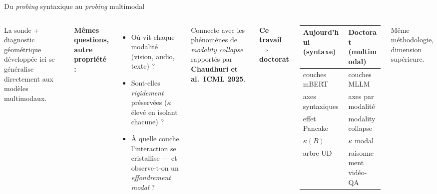 \documentclass[aspectratio=169,11pt]{beamer}
\begin{document}
\begin{frame}{Du \emph{probing} syntaxique au \emph{probing} multimodal}
  \begin{columns}[T]
    La sonde + diagnostic géométrique développée ici se généralise
    \alert{directement} aux modèles multimodaux.

    \vspace{0.3cm}
    \textbf{Mêmes questions, autre propriété :}
    \begin{itemize}\setlength\itemsep{4pt}
      \item Où vit chaque modalité (vision, audio, texte) ?
      \item Sont-elles \emph{rigidement} préservées
            ($\kappa$ élevé en isolant chacune) ?
      \item À quelle couche l'interaction se cristallise --- et
            observe-t-on un \emph{effondrement modal} ?
    \end{itemize}

    \vspace{0.3cm}
    \footnotesize
    Connecte avec les phénomènes de \emph{modality collapse} rapportés
    par \textbf{Chaudhuri et al.\ ICML 2025}.

    \centering
    \footnotesize
    \textbf{Ce travail \quad $\Longrightarrow$ \quad doctorat}

    \vspace{0.3cm}
    \begin{tabular}{ll}
      \toprule
      Aujourd'hui (syntaxe) & Doctorat (multimodal) \\
      \midrule
      couches mBERT  & couches MLLM \\
      axes syntaxiques & axes par modalité \\
      effet Pancake & modality collapse \\
      $\kappa(B)$    & $\kappa$ modal \\
      arbre UD & raisonnement vidéo-QA \\
      \bottomrule
    \end{tabular}

    \vspace{0.4cm}
    Même méthodologie, dimension supérieure.
  \end{columns}
\end{frame}
\end{document}
